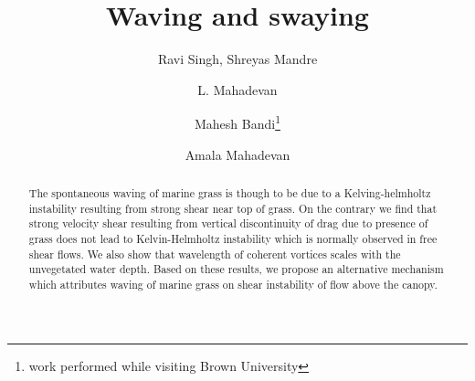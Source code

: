 \documentclass[aps,twocolumn,floatfix,prl,10pt]{revtex4-1}
\begin{document}
\title{Waving and swaying}
\author{Ravi Singh, Shreyas Mandre}
\author{L. Mahadevan}
\author{Mahesh Bandi\footnote{work performed while visiting Brown University}}
\author{Amala Mahadevan}

\begin{abstract}
The spontaneous waving of marine grass is though to be due to a Kelving-helmholtz instability resulting from strong shear near top of grass. On the contrary
we find that strong velocity shear resulting from vertical discontinuity of drag due to presence of grass does not lead to Kelvin-Helmholtz instability which is 
normally observed in free shear flows. We also show that wavelength of coherent vortices scales with the unvegetated water depth. Based on these results, 
we propose an alternative mechanism which attributes waving of marine grass on shear instability of flow above the canopy. 
\end{abstract}
\maketitle
\end{document}
